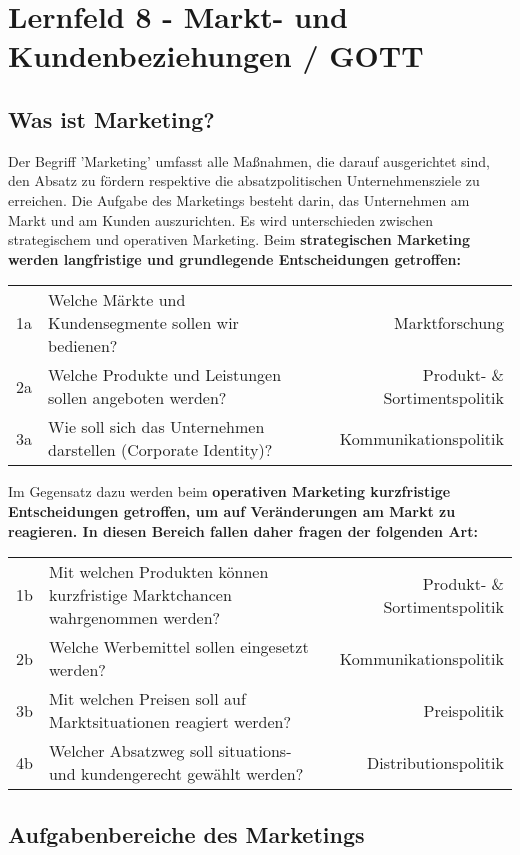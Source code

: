 \section{Lernfeld 8 - Markt- und Kundenbeziehungen / GOTT} %

\subsection{Was ist Marketing?}

Der Begriff 'Marketing' umfasst alle Maßnahmen, die darauf ausgerichtet sind, den Absatz zu fördern respektive die absatzpolitischen Unternehmensziele zu erreichen. Die Aufgabe des Marketings besteht darin, das Unternehmen am Markt und am Kunden auszurichten. Es wird unterschieden zwischen strategischem und operativen Marketing. Beim \bf{strategischen Marketing} werden langfristige und grundlegende Entscheidungen getroffen:
\begin{tabular}{llr}
	1a & Welche Märkte und Kundensegmente sollen wir bedienen? & Marktforschung \\
	2a & Welche Produkte und Leistungen sollen angeboten werden? & Produkt- \& Sortimentspolitik \\
	3a & Wie soll sich das Unternehmen darstellen (Corporate Identity)? & Kommunikationspolitik \\
\end{tabular}

Im Gegensatz dazu werden beim \bf{operativen Marketing} kurzfristige Entscheidungen getroffen, um auf Veränderungen am Markt zu reagieren. In diesen Bereich fallen daher fragen der folgenden Art:
\begin{tabular}{llr}
	1b & Mit welchen Produkten können kurzfristige Marktchancen wahrgenommen werden? & Produkt- \& Sortimentspolitik \\
	2b & Welche Werbemittel sollen eingesetzt werden? & Kommunikationspolitik \\
	3b & Mit welchen Preisen soll auf Marktsituationen reagiert werden? & Preispolitik \\
	4b & Welcher Absatzweg soll situations- und kundengerecht gewählt werden? & Distributionspolitik \\
\end{tabular}

\subsection{Aufgabenbereiche des Marketings}


